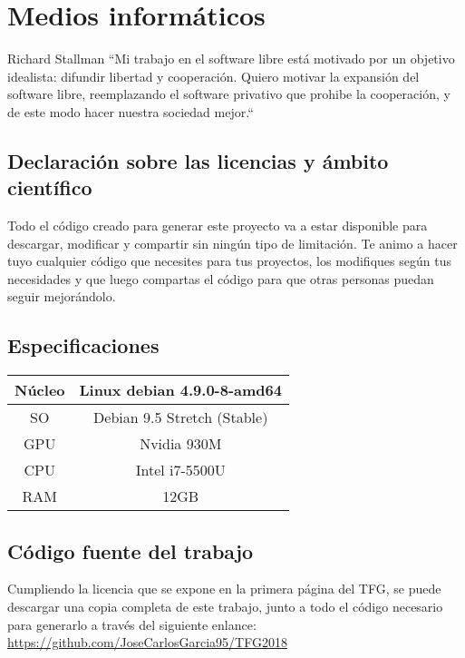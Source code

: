 \chapter*{Medios informáticos}
\begin{chapquote}{Richard Stallman}
	``Mi trabajo en el software libre está motivado por un objetivo idealista: difundir libertad y cooperación. Quiero motivar la expansión del software libre, reemplazando el software privativo que prohibe la cooperación, y de este modo hacer nuestra sociedad mejor.``
\end{chapquote}
\section*{Declaración sobre las licencias y ámbito científico}

Todo el código creado para generar este proyecto va a estar disponible para descargar, modificar y compartir sin ningún tipo de limitación. Te animo a hacer tuyo cualquier código que necesites para tus proyectos, los modifiques según tus necesidades y que luego compartas el código para que otras personas puedan seguir mejorándolo.

\section*{Especificaciones}
\begin{table}[htbp]
	\centering %
	\begin{tabular}{|c|c|}
		
		\hline
		Núcleo & Linux debian 4.9.0-8-amd64  \\ \hline
		SO & Debian 9.5 Stretch (Stable) \\ \hline
		GPU & Nvidia 930M \\ \hline
		CPU & Intel i7-5500U \\ \hline
		RAM & 12GB \\
		\hline
	\end{tabular}
	\label{tab:specs}
\end{table}

\section*{Código fuente del trabajo}
Cumpliendo la licencia que se expone en la primera página del TFG, se puede descargar una copia completa de este trabajo, junto a todo el código necesario para generarlo a través del siguiente enlance: \href{https://github.com/JoseCarlosGarcia95/TFG2018}{https://github.com/JoseCarlosGarcia95/TFG2018}